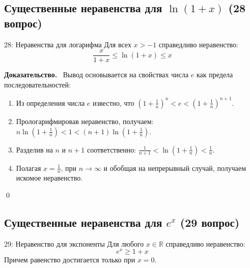 \documentclass[a4paper,12pt]{article}
\newcommand{\tsubsection}[2]{\subsection[#1]{\texorpdfstring{#2}{#1}}}
\newcommand{\myproof}{\textbf{Доказательство.}\ }
\begin{document}
	\tsubsection{Неравенства для логарифма (28 вопрос)}{Существенные неравенства для $\ln(1+x)$ (28 вопрос)}
	
	\begin{theorembox}{28: Неравенства для логарифма}
		Для всех $x > -1$ справедливо неравенство:
		\[ \frac{x}{1+x} \le \ln(1+x) \le x \]
	\end{theorembox}
	
	\vspace{0.5cm}
	\myproof
	Вывод основывается на свойствах числа $e$ как предела последовательностей:
	\begin{enumerate}
		\item Из определения числа $e$ известно, что $\left(1 + \frac{1}{n}\right)^n < e < \left(1 + \frac{1}{n}\right)^{n+1}$.
		\item Прологарифмировав неравенство, получаем: $n \ln(1 + \frac{1}{n}) < 1 < (n+1) \ln(1 + \frac{1}{n})$.
		\item Разделив на $n$ и $n+1$ соответственно: $\frac{1}{n+1} < \ln(1 + \frac{1}{n}) < \frac{1}{n}$.
		\item Полагая $x = \frac{1}{n}$, при $n \to \infty$ и обобщая на непрерывный случай, получаем искомое неравенство.
	\end{enumerate} \qed
	
	\begin{center}
	\end{center}
	
	
	\newpage
	\tsubsection{Неравенства для экспоненты (29 вопрос)}{Существенные неравенства для $e^x$ (29 вопрос)}
	
	\begin{theorembox}{29: Неравенство для экспоненты}
		Для любого $x \in \mathbb{R}$ справедливо неравенство:
		\[ e^x \ge 1 + x \]
		Причем равенство достигается только при $x = 0$.
	\end{theorembox}
	
\end{document}

